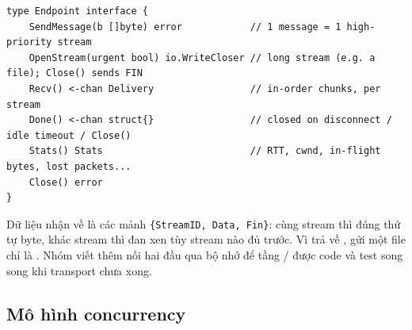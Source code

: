 \begin{lstlisting}[caption={Interface tầng transport cung cấp cho tầng ứng dụng (\fname{api.go})},
  label=lst:endpoint]
type Endpoint interface {
	SendMessage(b []byte) error            // 1 message = 1 high-priority stream
	OpenStream(urgent bool) io.WriteCloser // long stream (e.g. a file); Close() sends FIN
	Recv() <-chan Delivery                 // in-order chunks, per stream
	Done() <-chan struct{}                 // closed on disconnect / idle timeout / Close()
	Stats() Stats                          // RTT, cwnd, in-flight bytes, lost packets...
	Close() error
}
\end{lstlisting}

Dữ liệu nhận về là các mảnh \texttt{\{StreamID, Data, Fin\}}: cùng stream thì đúng thứ tự byte,
khác stream thì đan xen tùy stream nào đủ trước. Vì  trả về , gửi một file
chỉ là . Nhóm viết thêm  nối hai đầu qua bộ nhớ để
tầng / được code và test song song khi transport chưa xong.

\subsection{Mô hình concurrency}
\label{subsec:concurrency}

